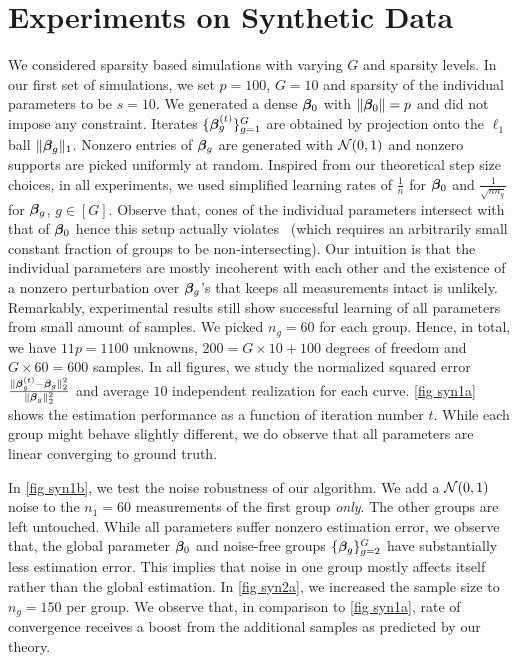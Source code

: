 \section{Experiments on Synthetic Data}
\label{sec:expds}
We considered sparsity based simulations with varying $G$ and sparsity levels. In our first set of simulations, we set $p=100$, $G=10$ and sparsity of the individual parameters to be $s=10$. We generated a dense $\boldsymbol{\beta}_0$ with $\|\boldsymbol{\beta}_0\|=p$ and did not impose any constraint. Iterates $\{\boldsymbol{\beta}^{(t)}_g\}_{g=1}^G$ are obtained by projection onto the $\ell_1$ ball $\|\boldsymbol{\beta}_g\|_1$. Nonzero entries of $\boldsymbol{\beta}_g$ are generated with ${\cal{N}}(0,1)$ and nonzero supports are picked uniformly at random. Inspired from our theoretical step size choices, in all experiments, we used simplified learning rates of $\frac{1}{n}$ for $\boldsymbol{\beta}_0$ and $\frac{1}{\sqrt{nn_g}}$ for $\boldsymbol{\beta}_g$, $g \in [G]$. Observe that, cones of the individual parameters intersect with that of $\boldsymbol{\beta}_0$ hence this setup actually violates \ds\ (which requires an arbitrarily small constant fraction of groups to be non-intersecting). Our intuition is that the individual parameters are mostly incoherent with each other and the existence of a nonzero perturbation over $\boldsymbol{\beta}_g$'s that keeps all measurements intact is unlikely. Remarkably, experimental results still show successful learning of all parameters from small amount of samples. We picked $n_g=60$ for each group. Hence, in total, we have $11p=1100$ unknowns, $200=G\times 10+100$ degrees of freedom and $G\times 60=600$ samples. In all figures, we study the normalized squared error $\frac{\|\boldsymbol{\beta}^{(t)}_g-\boldsymbol{\beta}_g\|_2^2}{\|\boldsymbol{\beta}_g\|_2^2}$ and average $10$ independent realization for each curve. \cref{fig syn1a} shows the estimation performance as a function of iteration number $t$. While each group might behave slightly different, we do observe that all parameters are linear converging to ground truth.%
	
In \cref{fig syn1b}, we test the noise robustness of our algorithm. We add a ${\cal{N}}(0,1)$ noise to the $n_1=60$ measurements of the first group \emph{only}. The other groups are left untouched. While all parameters suffer nonzero estimation error, we observe that, the global parameter $\boldsymbol{\beta}_0$ and noise-free groups $\{\boldsymbol{\beta}_g\}_{g=2}^G$ have substantially less estimation error. This implies that noise in one group mostly affects itself rather than the global estimation. In \cref{fig syn2a}, we increased the sample size to $n_g=150$ per group. We observe that, in comparison to \cref{fig syn1a}, rate of convergence receives a boost from the additional samples as predicted by our theory.
	
